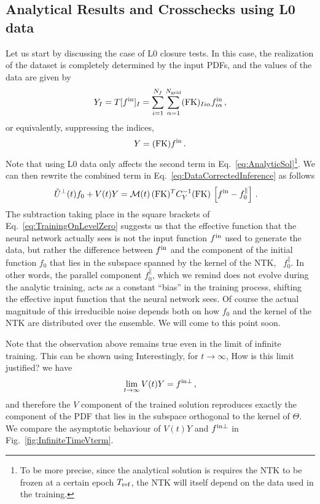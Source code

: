\subsection{Analytical Results and Crosschecks using L0 data}
\label{sec:AnalyticalChecks}
Let us start by discussing the case of L0 closure tests. In this case, the realization
of the dataset is completely determined by the input PDFs, and the values of the data
are given by
\begin{equation}
    \label{eq:DataL0}
    Y_I = T[f^{\rm in}]_I
        = \sum_{i=1}^{N_{f}} \sum_{\alpha=1}^{N_{\mathrm{grid}}} (\mathrm{FK})_{Ii\alpha} f^{\rm in}_{i\alpha}\, ,
\end{equation}
or equivalently, suppressing the indices,
\begin{equation}
    \label{eq:DataL0NoIndices}
    Y = (\mathrm{FK}) f^{\rm in}\, .
\end{equation}
Note that using L0 data only affects the second term in
Eq.~\ref{eq:AnalyticSol}\footnote{To be more precise, since the analytical
solution is requires the NTK to be frozen at a certain epoch $T_{\rm ref}$, the
NTK will itself depend on the data used in the training.}. We can then rewrite the
combined term in Eq.~\eqref{eq:DataCorrectedInference} as follows
\begin{align}
  \label{eq:TrainingOnLevelZero}
  \check{U}^\perp(t) f_0 + V(t) Y 
    &= \mathcal{M}(t)\, (\mathrm{FK})^T C_{Y}^{-1} (\mathrm{FK})\, 
      \left[f^{\rm in} - f_{0}^\parallel\right]\, .
\end{align}
The subtraction taking place in the square brackets of
Eq.~\eqref{eq:TrainingOnLevelZero} suggests us that the effective function that
the neural network actually sees is not the input function $f^{\rm in}$ used to
generate the data, but rather the difference between $f^{\rm in}$ and the component of
the initial function $f_0$ that lies in the subspace spanned by the kernel of
the NTK, \ie\ $f_0^\parallel$. In other words, the parallel component
$f_0^\parallel$, which we remind does not evolve during the analytic training,
acts as a constant ``bias'' in the training process, shifting the effective
input function that the neural network sees. Of course the actual magnitude of
this irreducible noise depends both on how $f_0$ and the kernel of the NTK are
distributed over the ensemble. We will come to this point soon.

Note that the observation above remains true even in the limit of infinite training.
This can be shown using
Interestingly, for $t\to\infty$, \ac{How is
this limit justified?} we have
\begin{align}
    \label{eq:LevelZeroClosureInfiniteTraining}
    \lim_{t\to\infty} V(t) Y = f^{\rm in \perp}\, ,
\end{align}
and therefore the $V$ component of the trained solution reproduces exactly the
component of the PDF that lies in  the subspace orthogonal to the kernel of
$\Theta$. We compare the asymptotic behaviour of $V(t) Y$ and $f^{\rm in \perp}$ in
Fig.~\ref{fig:InfiniteTimeVterm}.

